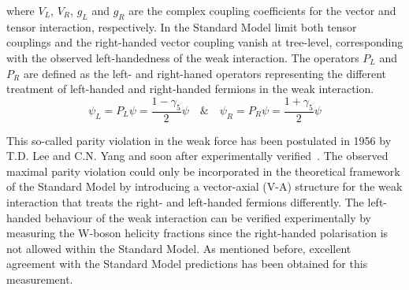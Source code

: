 where $V_L$, $V_R$, $g_L$ and $g_R$ are the complex coupling coefficients for the vector and tensor interaction, respectively.
In the Standard Model limit both tensor couplings and the right-handed vector coupling vanish at tree-level, corresponding with the observed left-handedness of the weak interaction.
The operators $P_L$ and $P_R$ are defined as the left- and right-haned operators representing the different treatment of left-handed and right-handed fermions in the weak interaction.
\begin{equation}
 \psi_L = P_L \psi = \frac{1-\gamma_5}{2} \psi \quad \& \quad \psi_R = P_R \psi = \frac{1+\gamma_5}{2} \psi
\end{equation}

This so-called parity violation in the weak force has been postulated in 1956 by T.D. Lee and C.N. Yang and soon after experimentally verified~\cite{PViolationLeeYang, PViolationWu}. 
The observed maximal parity violation could only be incorporated in the theoretical framework of the Standard Model by introducing a vector-axial (V-A) structure for the weak interaction that treats the right- and left-handed fermions differently.
The left-handed behaviour of the weak interaction can be verified experimentally by measuring the W-boson helicity fractions since the right-handed polarisation is not allowed within the Standard Model.
As mentioned before, excellent agreement with the Standard Model predictions has been obtained for this measurement.
\\

